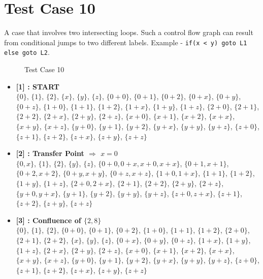 \section{Test Case 10}
\label{sec:tc10}
A case that involves two intersecting loops. Such a control flow graph can result from conditional jumps to two different labels. Example - \texttt{if(x < y) goto L1 else goto L2}.

\begin{figure}[H]
\label{fig:tc10}
    \caption{Test Case 10}
\end{figure}

\begin{itemize}

    \item \textbf{[1] : START}\\
        $\{0\}$, $\{1\}$, $\{2\}$, $\{x\}$, $\{y\}$, $\{z\}$, $\{0 + 0\}$, $\{0 + 1\}$, $\{0 + 2\}$, $\{0 + x\}$, $\{0 + y\}$, $\{0 + z\}$, $\{1 + 0\}$, $\{1 + 1\}$, $\{1 + 2\}$, $\{1 + x\}$, $\{1 + y\}$, $\{1 + z\}$, $\{2 + 0\}$, $\{2 + 1\}$, $\{2 + 2\}$, $\{2 + x\}$, $\{2 + y\}$, $\{2 + z\}$, $\{x + 0\}$, $\{x + 1\}$, $\{x + 2\}$, $\{x + x\}$, $\{x + y\}$, $\{x + z\}$, $\{y + 0\}$, $\{y + 1\}$, $\{y + 2\}$, $\{y + x\}$, $\{y + y\}$, $\{y + z\}$, $\{z + 0\}$, $\{z + 1\}$, $\{z + 2\}$, $\{z + x\}$, $\{z + y\}$, $\{z + z\}$

    \item \textbf{[2] : Transfer Point $\Rightarrow$ $x = 0$}\\
        $\{0, x\}$, $\{1\}$, $\{2\}$, $\{y\}$, $\{z\}$, $\{0 + 0, 0 + x, x + 0, x + x\}$, $\{0 + 1, x + 1\}$, $\{0 + 2, x + 2\}$, $\{0 + y, x + y\}$, $\{0 + z, x + z\}$, $\{1 + 0, 1 + x\}$, $\{1 + 1\}$, $\{1 + 2\}$, $\{1 + y\}$, $\{1 + z\}$, $\{2 + 0, 2 + x\}$, $\{2 + 1\}$, $\{2 + 2\}$, $\{2 + y\}$, $\{2 + z\}$, $\{y + 0, y + x\}$, $\{y + 1\}$, $\{y + 2\}$, $\{y + y\}$, $\{y + z\}$, $\{z + 0, z + x\}$, $\{z + 1\}$, $\{z + 2\}$, $\{z + y\}$, $\{z + z\}$

    \item \textbf{[3] : Confluence of $\{2, 8\}$}\\
        $\{0\}$, $\{1\}$, $\{2\}$, $\{0 + 0\}$, $\{0 + 1\}$, $\{0 + 2\}$, $\{1 + 0\}$, $\{1 + 1\}$, $\{1 + 2\}$, $\{2 + 0\}$, $\{2 + 1\}$, $\{2 + 2\}$, $\{x\}$, $\{y\}$, $\{z\}$, $\{0 + x\}$, $\{0 + y\}$, $\{0 + z\}$, $\{1 + x\}$, $\{1 + y\}$, $\{1 + z\}$, $\{2 + x\}$, $\{2 + y\}$, $\{2 + z\}$, $\{x + 0\}$, $\{x + 1\}$, $\{x + 2\}$, $\{x + x\}$, $\{x + y\}$, $\{x + z\}$, $\{y + 0\}$, $\{y + 1\}$, $\{y + 2\}$, $\{y + x\}$, $\{y + y\}$, $\{y + z\}$, $\{z + 0\}$, $\{z + 1\}$, $\{z + 2\}$, $\{z + x\}$, $\{z + y\}$, $\{z + z\}$


\end{itemize}
